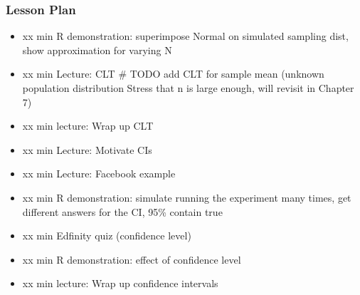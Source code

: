 

\begin{frame}
\frametitle{Lesson Plan}
\begin{itemize}
    \item xx min R demonstration: superimpose Normal on simulated sampling dist, show approximation for varying N 
    \item xx min Lecture: CLT # TODO add CLT for sample mean (unknown population distribution Stress that n is large enough, will revisit in Chapter 7)
    \item xx min lecture: Wrap up CLT

    \item xx min Lecture: Motivate CIs
    \item xx min Lecture: Facebook example
    \item xx min R demonstration: simulate running the experiment many times, get different answers for the CI, 95\% contain true
    \item xx min Edfinity quiz (confidence level)
    \item xx min R demonstration: effect of confidence level
    \item xx min lecture: Wrap up confidence intervals
\end{itemize}
\end{frame}
        



